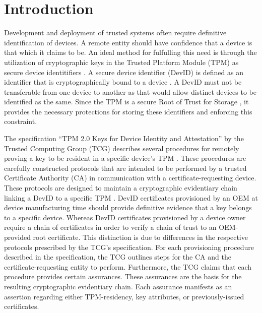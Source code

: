 \documentclass[runningheads]{llncs}
\begin{document}
\section{Introduction}
Development and deployment of trusted systems often require definitive identification of devices. A remote entity should have confidence that a device is that which it claims to be. An ideal method for fulfulling this need is through the utilization of cryptographic keys in the Trusted Platform Module (TPM) as secure device identitifiers \citep{DevIDSpec-TCG}. A secure device identifier (DevID) is defined as an identifier that is cryptographically bound to a device \citep{DevIDSpec-IEEE}. 
A DevID must not be transferable from one device to another as that would allow distinct devices to be identified as the same. 
Since the TPM is a secure Root of Trust for Storage \citep{TPMSpec}, it provides the necessary protections for storing these identifiers and enforcing this constraint. 

The specification ``TPM 2.0 Keys for Device Identity and Attestation'' by the Trusted Computing Group (TCG) describes several procedures for remotely proving a key to be resident in a specific device's TPM \citep{DevIDSpec-TCG}. These procedures are carefully constructed protocols that are intended to be performed by a trusted Certificate Authority (CA) in communication with a certificate-requesting device. These protocols are designed to maintain a cryptographic evidentiary chain linking a DevID to a specific TPM \citep{DevIDSpec-TCG}. 
DevID certificates provisioned by an OEM at device manufacturing time should provide definitive evidence that a key belongs to a specific device. Whereas DevID certificates provisioned by a device owner require a chain of certificates in order to verify a chain of trust to an OEM-provided root certificate. This distinction is due to differences in the respective protocols prescribed by the TCG's specification. 
For each provisioning procedure described in the specification, the TCG outlines steps for the CA and the certificate-requesting entity to perform. Furthermore, the TCG claims that each procedure provides certain assurances. These assurances are the basis for the resulting cryptographic evidentiary chain.
Each assurance manifests as an assertion regarding either TPM-residency, key attributes, or previously-issued certificates.
\end{document}
